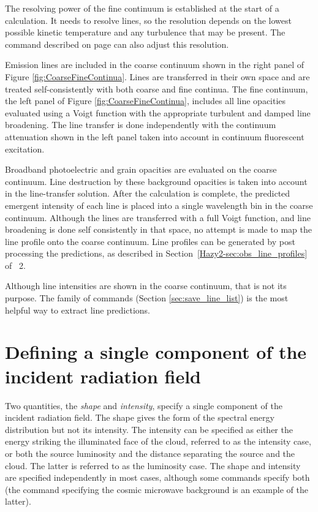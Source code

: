 The resolving power of the fine continuum is established at the start of a calculation.
It needs to resolve lines, so the resolution depends on the lowest possible kinetic temperature
and any turbulence that may be present.
The  command described on 
page \pageref{sec:CommandSetFineContinuum}
can also adjust this resolution.

Emission lines are included in the coarse continuum shown in the right panel of 
Figure \ref{fig:CoarseFineContinua}.  
Lines are transferred in their own space and are treated self-consistently with both
coarse and fine continua.  
The fine continuum, the left panel of Figure \ref{fig:CoarseFineContinua}, includes all
line opacities evaluated using a Voigt function with the appropriate turbulent and damped line broadening.
The line transfer is done independently with the continuum attenuation shown in the left panel
taken into account in continuum fluorescent excitation.

Broadband photoelectric and grain opacities are evaluated on the coarse continuum.
Line destruction by these background opacities is taken into account in the line-transfer solution.
After the calculation is complete, the predicted emergent intensity of each line is placed into a single
wavelength bin in the coarse continuum.  
Although the lines are transferred with a full Voigt function, and line broadening is
done self consistently in that space, no attempt is made to map the line profile onto the
coarse continuum.
Line profiles can be generated by post processing the predictions, as described in
Section~\ref{Hazy2-sec:obs_line_profiles} of \Hazy\ 2.

Although line intensities are shown in the coarse continuum, that is not its purpose.
The  family of commands 
(Section \ref{sec:save_line_list}) is the most helpful way 
to extract line predictions.

\section{Defining a single component of the incident radiation field}

Two quantities, the \emph{shape} and \emph{intensity},
specify a single component of the incident radiation field.
The shape gives the form of the spectral energy distribution
but not its intensity.
The intensity can be specified as either the energy striking
the illuminated face of the cloud, referred to as
the intensity case, or both the source luminosity and the
distance separating the source and the cloud.  
The latter is referred to as the luminosity case.
The shape and intensity are specified independently
in most cases, although some commands specify both 
(the command specifying
the cosmic microwave background is an example of the latter).

